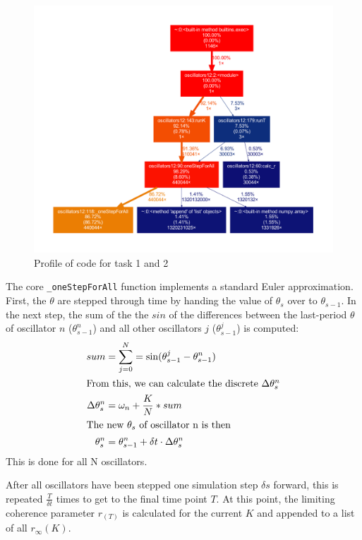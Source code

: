 \documentclass[11pt,a4paper]{article}
\newcommand{\graph}{\medskip\noindent}
\newcommand{\code}[1]{\texttt{#1}}
\begin{document}
\begin{figure}[h]
	\centering
	\includegraphics[width=\textwidth]{graphics/profile12a.pdf}
	\caption{Profile of code for task 1 and 2}
	\label{profile12}
\end{figure}
%
%
The core \code{\_oneStepForAll} function implements a standard Euler approximation.
First, the $\theta$ are stepped through time by handing the value of $\theta_{s}$ over to $\theta_{s-1}$.
In the next step, the sum of the the $sin$ of the differences between the last-period $\theta$ of oscillator $n$ ($\theta_{s-1}^n$) and all other oscillators $j$ ($\theta_{s-1}^j$) is computed:
\begin{align*}
	sum 					& = \sum_{j = 0}^N = \sin(\theta^j_{s-1} - \theta^n_{s-1}) \\
\intertext{From this, we can calculate the discrete $\Delta\theta_s^n$}
	\Delta\theta_s^n 		& = \omega_n + \frac{K}{N} *  sum \\
\intertext{The new $\theta_s$ of oscillator n is then}
	\theta^n_s 				& = \theta^n_{s-1} + \delta t \cdot \Delta\theta_s^n \\
\end{align*}
This is done for all N oscillators. 




\graph
After all oscillators have been stepped one simulation step $\delta s$ forward, this is repeated $\frac{T}{\delta t}$ times to get to the final time point $T$.
At this point, the limiting coherence parameter $r_(T)$ is calculated for the current $K$ and appended to a list of all $r_\infty(K)$. 
\end{document}
